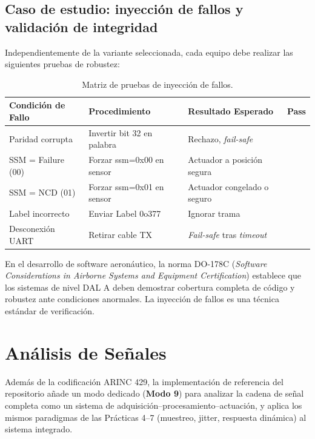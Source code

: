 \documentclass[11pt]{article}
\begin{document}
\subsection{Caso de estudio: inyección de fallos y validación de integridad}
Independientemente de la variante seleccionada, cada equipo debe realizar las siguientes
pruebas de robustez:
\begin{table}[H]\centering
\caption{Matriz de pruebas de inyección de fallos.}
\begin{tabular}{llll}
\toprule
Condición de Fallo & Procedimiento & Resultado Esperado & Pass \\
\midrule
Paridad corrupta & Invertir bit 32 en palabra & Rechazo, \emph{fail-safe} & \\
SSM = Failure (00) & Forzar ssm=0x00 en sensor & Actuador a posición segura & \\
SSM = NCD (01) & Forzar ssm=0x01 en sensor & Actuador congelado o seguro & \\
Label incorrecto & Enviar Label 0o377 & Ignorar trama & \\
Desconexión UART & Retirar cable TX & \emph{Fail-safe} tras \emph{timeout} & \\
\bottomrule
\end{tabular}
\end{table}

\begin{nota}
En el desarrollo de software aeronáutico, la norma DO-178C (\emph{Software
Considerations in Airborne Systems and Equipment Certification}) establece que los
sistemas de nivel DAL A deben demostrar cobertura completa de código y robustez ante
condiciones anormales. La inyección de fallos es una técnica estándar de verificación.
\end{nota}

\section{Análisis de Señales}
\label{sec:senales}

Además de la codificación ARINC 429, la implementación de referencia del repositorio
añade un modo dedicado (\textbf{Modo 9}) para analizar la cadena de señal completa como
un sistema de adquisición--procesamiento--actuación, y aplica los mismos paradigmas de
las Prácticas 4--7 (muestreo, jitter, respuesta dinámica) al sistema integrado.
\end{document}
